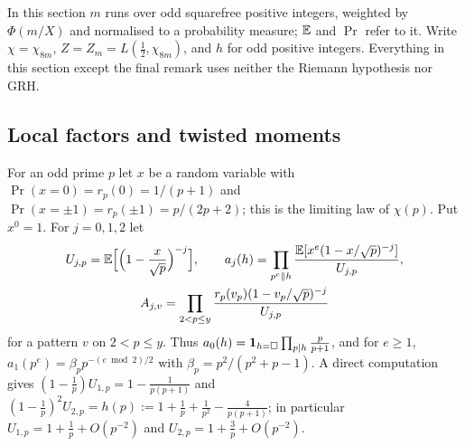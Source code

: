 \documentclass[11pt,colorlinks]{charlie}
\begin{document}
In this section $m$ runs over odd squarefree positive integers, weighted by $\Phi(m/X)$ and normalised to a probability measure; $\mathbb{E}$ and $\Pr$ refer to it. Write $\chi=\chi_{8m}$, $Z=Z_m=L(\frac12,\chi_{8m})$, and $h$ for odd positive integers. Everything in this section except the final remark uses neither the Riemann hypothesis nor GRH.

\subsection{Local factors and twisted moments}
For an odd prime $p$ let $x$ be a random variable with $\Pr(x=0)=r_p(0)=1/(p+1)$ and $\Pr(x=\pm1)=r_p(\pm1)=p/(2p+2)$; this is the limiting law of $\chi(p)$. Put $x^0=1$. For $j=0,1,2$ let
\begin{gather*}
 U_{j,p}=\mathbb{E}\Big[\Big(1-\frac x{\sqrt p}\Big)^{-j}\Big],\qquad a_j(h)=\prod_{p^e\parallel h}\frac{\mathbb{E}[x^e(1-x/\sqrt p)^{-j}]}{U_{j,p}},\\
 A_{j,v}=\prod_{2<p\le y}\frac{r_p(v_p)(1-v_p/\sqrt p)^{-j}}{U_{j,p}}
\end{gather*}
for a pattern $v$ on $2<p\le y$. Thus $a_0(h)=\mathbf{1}_{h=\square}\prod_{p\mid h}\frac p{p+1}$, and for $e\ge1$, $a_1(p^e)=\beta_pp^{-(e\bmod2)/2}$ with $\beta_p=p^2/(p^2+p-1)$. A direct computation gives $(1-\frac1p)U_{1,p}=1-\frac1{p(p+1)}$ and $(1-\frac1p)^2U_{2,p}=h(p):=1+\frac1p+\frac1{p^2}-\frac4{p(p+1)}$; in particular $U_{1,p}=1+\frac1p+O(p^{-2})$ and $U_{2,p}=1+\frac3p+O(p^{-2})$.
\end{document}
